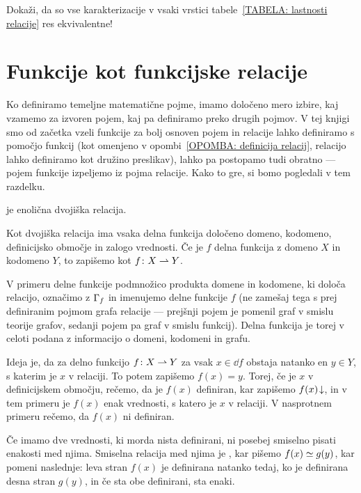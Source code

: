 		\begin{vaja}
			Dokaži, da so vse karakterizacije v vsaki vrstici tabele~\ref{TABELA: lastnosti relacije} res ekvivalentne!
		\end{vaja}
	
	
	\section{Funkcije kot funkcijske relacije}\label{RAZDELEK: Funkcije kot funkcijske relacije}
	
		Ko definiramo temeljne matematične pojme, imamo določeno mero izbire, kaj vzamemo za izvoren pojem, kaj pa definiramo preko drugih pojmov. V tej knjigi smo od začetka vzeli funkcije za bolj osnoven pojem in relacije lahko definiramo s pomočjo funkcij (kot omenjeno v opombi~\ref{OPOMBA: definicija relacij}, relacijo lahko definiramo kot družino preslikav), lahko pa postopamo tudi obratno --- pojem funkcije izpeljemo iz pojma relacije. Kako to gre, si bomo pogledali v tem razdelku.
		
		\begin{definicija}
			 je enolična dvojiška relacija.
		\end{definicija}
		
		Kot dvojiška relacija ima vsaka delna funkcija določeno domeno, kodomeno, definicijsko območje in zalogo vrednosti. Če je $f$ delna funkcija z domeno $X$ in kodomeno $Y$, to zapišemo kot $f\colon X \mathrel{\rightharpoonup} Y$.
		
		V primeru delne funkcije podmnožico produkta domene in kodomene, ki določa relacijo, označimo z $\Gamma_{f}$ in imenujemo  delne funkcije $f$ (ne zamešaj tega s prej definiranim pojmom grafa relacije --- prejšnji pojem je pomenil graf v smislu teorije grafov, sedanji pojem pa graf v smislu funkcij). Delna funkcija je torej v celoti podana z informacijo o domeni, kodomeni in grafu.
		
		Ideja je, da za delno funkcijo $f\colon X \mathrel{\rightharpoonup} Y$ za vsak $x \in \dd{f}$ obstaja natanko en $y \in Y$, s katerim je $x$ v relaciji. To potem zapišemo $f(x) = y$. Torej, če je $x$ v definicijskem območju, rečemo, da je $f(x)$ definiran, kar zapišemo ${f(x)}\!\downarrow$, in v tem primeru je $f(x)$ enak vrednosti, s katero je $x$ v relaciji. V nasprotnem primeru rečemo, da $f(x)$ ni definiran.
		
		Če imamo dve vrednosti, ki morda nista definirani, ni posebej smiselno pisati enakosti med njima. Smiselna relacija med njima je , kar pišemo $f(x) \simeq g(y)$, kar pomeni naslednje: leva stran $f(x)$ je definirana natanko tedaj, ko je definirana desna stran $g(y)$, in če sta obe definirani, sta enaki.
		
